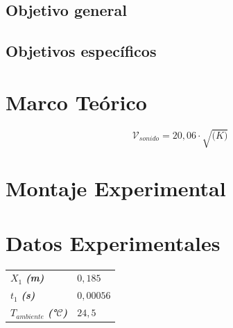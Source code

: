 \documentclass[twocolumn, 12pt]{article}
\newcommand{\bolditalic}[1]{\textbf{\textit{#1}}}
\begin{document}
\subsection{Objetivo general}

\subsection{Objetivos específicos}

\section{Marco Teórico}

\begin{equation}
    \mathcal{V}_{sonido} = 20,06 \cdot\sqrt{\mathcal(K)}
\end{equation}

\section{Montaje Experimental}

\section{Datos Experimentales}

\begin{table}[H]
    \begin{center}
        \begin{tabularx}{.9\linewidth}{|>{\centering\arraybackslash}X|>{\centering\arraybackslash}X|}
            \hline
            \multicolumn{2}{|c|}{Constantes}                         \\\hline
            $X_{1}$ \bolditalic{(m)}                     & $0,185$   \\\hline
            $t_{1}$ \bolditalic{(s)}                     & $0,00056$ \\\hline
            $T_{ambiente}$ \bolditalic{(°$\mathcal{C}$)} & $24,5$    \\\hline
        \end{tabularx}
    \end{center}
\end{table}
\end{document}
